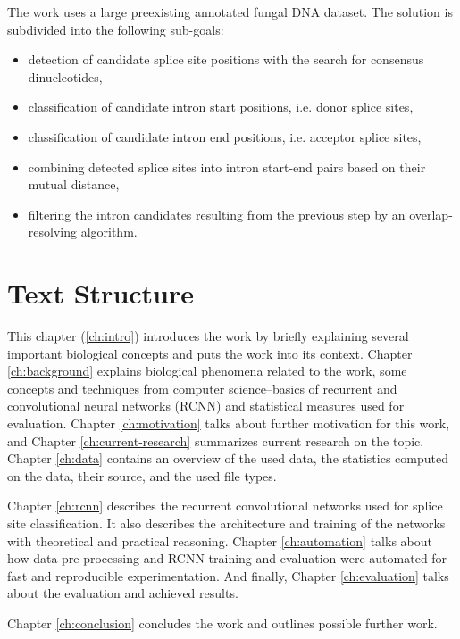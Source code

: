 The work uses a large preexisting annotated fungal DNA dataset. The solution is
subdivided into the following sub-goals:

\begin{itemize}
  \item detection of candidate splice site positions with the search for
    consensus dinucleotides,
  \item classification of candidate intron start positions, i.e. donor splice
    sites,
  \item classification of candidate intron end positions, i.e. acceptor splice
    sites,
  \item combining detected splice sites into intron start-end pairs based on
    their mutual distance,
  \item filtering the intron candidates resulting from the previous step by an
    overlap-resolving algorithm.
\end{itemize}

\section{Text Structure}

This chapter (\ref{ch:intro}) introduces the work by briefly explaining several
important biological concepts and puts the work into its context. Chapter
\ref{ch:background} explains biological phenomena related to the work, some
concepts and techniques from computer science--basics of recurrent and
convolutional neural networks (RCNN) and statistical measures used for
evaluation. Chapter \ref{ch:motivation} talks about further motivation for this
work, and Chapter \ref{ch:current-research} summarizes current research on the
topic. Chapter \ref{ch:data} contains an overview of the used data, the
statistics computed on the data, their source, and the used file types.

Chapter \ref{ch:rcnn} describes the recurrent convolutional networks used for
splice site classification. It also describes the architecture and training of
the networks with theoretical and practical reasoning. Chapter
\ref{ch:automation} talks about how data pre-processing and RCNN training and
evaluation were automated for fast and reproducible experimentation. And
finally, Chapter \ref{ch:evaluation} talks about the evaluation and achieved
results.

Chapter \ref{ch:conclusion} concludes the work and outlines possible further
work.
